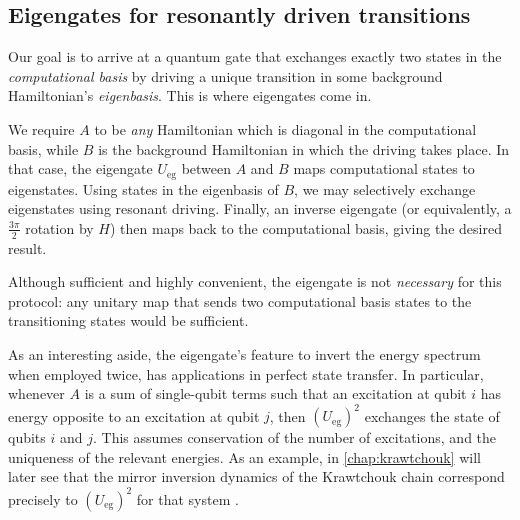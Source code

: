 \subsection{Eigengates for resonantly driven transitions}
Our goal is to arrive at a quantum gate that exchanges exactly two states in the \emph{computational basis} by driving a unique transition in some background Hamiltonian's \emph{eigenbasis}. This is where eigengates come in. 

We require $A$ to be \textit{any} Hamiltonian which is diagonal in the computational basis, while $B$ is the background Hamiltonian in which the driving takes place. In that case, the eigengate $U_\text{eg}$ between $A$ and $B$ maps computational states to eigenstates. Using states in the eigenbasis of $B$, we may selectively exchange eigenstates using resonant driving. Finally, an inverse eigengate (or equivalently, a $\frac{3 \pi}{2}$ rotation by $H$) then maps back to the computational basis, giving the desired result. 

Although sufficient and highly convenient, the eigengate is not \emph{necessary} for this protocol: any unitary map that sends two computational basis states to the transitioning states would be sufficient. 

As an interesting aside, the eigengate's feature to invert the energy spectrum when employed twice, has applications in perfect state transfer. In particular, whenever $A$ is a sum of single-qubit terms such that an excitation at qubit $i$ has energy opposite to an excitation at qubit $j$, then $(U_\text{eg})^2$ exchanges the state of qubits $i$ and $j$. This assumes conservation of the number of excitations, and the uniqueness of the relevant energies. As an example, in \cref{chap:krawtchouk} will later see that the mirror inversion dynamics of the Krawtchouk chain correspond precisely to $(U_\text{eg})^2$ for that system \cite{Christandl2004,Groenland2018}. 




